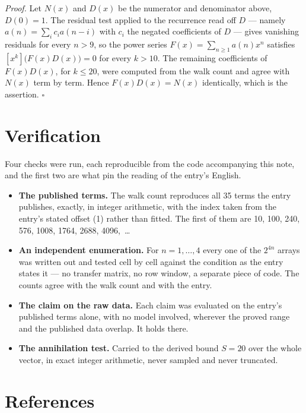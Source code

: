 \documentclass[11pt]{article}
\theoremstyle{definition}
\begin{document}
{\itshape Proof.} Let $N(x)$ and $D(x)$ be the numerator and denominator above, $D(0)=1$. The residual test applied to the recurrence read off $D$ --- namely $a(n) = \sum_i c_i a(n-i)$ with $c_i$ the negated coefficients of $D$ --- gives vanishing residuals for every $n > 9$, so the power series $F(x)=\sum_{n\ge 1}a(n)x^n$ satisfies $[x^k]\bigl(F(x)D(x)\bigr) = 0$ for every $k > 10$. The remaining coefficients of $F(x)D(x)$, for $k \le 20$, were computed from the walk count and agree with $N(x)$ term by term. Hence $F(x)D(x) = N(x)$ identically, which is the assertion. $\square$

\section{Verification}

Four checks were run, each reproducible from the code accompanying this note, and the first two are what pin the reading of the entry's English.

\begin{itemize}

\item {\bfseries The published terms.} The walk count reproduces all 35 terms the entry publishes, exactly, in integer arithmetic, with the index taken from the entry's stated offset (1) rather than fitted. The first of them are 10, 100, 240, 576, 1008, 1764, 2688, 4096,~\dots

\item {\bfseries An independent enumeration.} For $n = 1,\dots,4$ every one of the $2^{4n}$ arrays was written out and tested cell by cell against the condition as the entry states it --- no transfer matrix, no row window, a separate piece of code. The counts agree with the walk count and with the entry.

\item {\bfseries The claim on the raw data.} Each claim was evaluated on the entry's published terms alone, with no model involved, wherever the proved range and the published data overlap. It holds there.

\item {\bfseries The annihilation test.} Carried to the derived bound $S = 20$ over the whole vector, in exact integer arithmetic, never sampled and never truncated.

\end{itemize}

\section{References}
\end{document}
